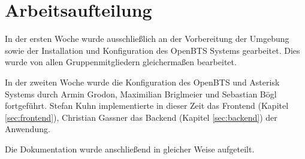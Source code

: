 \section{Arbeitsaufteilung}
In der ersten Woche wurde ausschließlich an der Vorbereitung der Umgebung sowie der Installation und Konfiguration des OpenBTS Systems gearbeitet. Dies wurde von allen Gruppenmitgliedern gleichermaßen bearbeitet.

In der zweiten Woche wurde die Konfiguration des OpenBTS und Asterisk Systems durch Armin Grodon, Maximilian Briglmeier und Sebastian Bögl fortgeführt. Stefan Kuhn implementierte in dieser Zeit das Frontend (Kapitel \ref{sec:frontend}), Christian Gassner das Backend (Kapitel \ref{sec:backend}) der Anwendung.

Die Dokumentation wurde anschließend in gleicher Weise aufgeteilt.